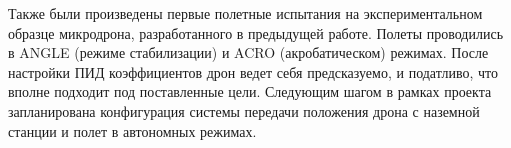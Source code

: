 \documentclass[a4paper,12pt]{article}
\begin{document}
Также были произведены первые полетные испытания на экспериментальном образце микродрона, разработанного в предыдущей работе. Полеты проводились в ANGLE (режиме стабилизации) и ACRO (акробатическом) режимах. После настройки ПИД коэффициентов дрон ведет себя предсказуемо, и податливо, что вполне подходит под поставленные цели. Следующим шагом в рамках проекта запланирована конфигурация системы передачи положения дрона с наземной станции и полет в автономных режимах.

\pagebreak

\printbibliography

\pagebreak
\end{document}
